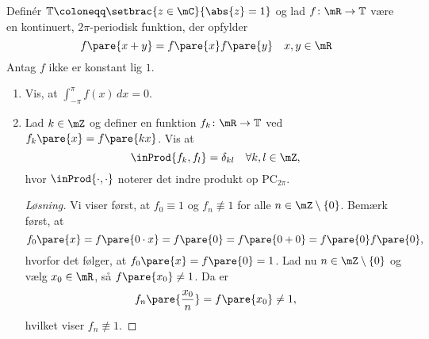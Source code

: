 \begin{opg}
Definér $\mathbb{T}\coloneqq\setbrac{z\in\mC}{\abs{z} = 1}$ og lad $f\colon\mR\to\mathbb{T}$ være en kontinuert, $2\pi$-periodisk funktion, der opfylder
$$ f\pare{x+y} = f\pare{x}f\pare{y} \quad x,y\in\mR$$
Antag $f$ ikke er konstant lig $1$. 
\begin{enumerate}
    \item Vis, at $\int_{-\pi}^{\pi} f(x)\,dx = 0$.
    
    \iffalse\begin{proof}[Løsning]
    Lad $x_0\in\mR$ og antag $f\pare{x_0}\neq 1$. Da $f$ er $2\pi$-periodisk kan vi antage $x_0\in[0,2\pi)$. Vi får ved integration ved substitution, at
    $$ \int_{-\pi}^\pi f\pare{x} \, dx
        = \int_{-\pi-x_0}^{\pi-x_0} f\pare{x+x_0} \, dx
        = f\pare{x_0}\int_{-\pi-x_0}^{\pi-x_0} f\pare{x} \, dx $$
    Ved at udnytte $2\pi$-periodiciteten af $f$, får vi
    \begin{align*}
        \int_{-\pi-x_0}^{\pi-x_0} f\pare{x} \, dx  
            = \int_{-\pi-x_0}^{-\pi} f\pare{x} \, dx
                + \int_{-\pi}^{\pi-x_0} f\pare{x} \, dx 
            &= \int_{-\pi-x_0}^{-\pi} f\pare{x+2\pi} \, dx
                + \int_{-\pi}^{\pi-x_0} f\pare{x} \, dx \\
            &\overset{\pare{\dagger}}{=} \int_{\pi-x_0}^{\pi} f\pare{x} \, dx
                + \int_{-\pi}^{\pi-x_0} f\pare{x} \, dx \\
            &= \int_{-\pi}^{\pi} f\pare{x} \, dx
    \end{align*}
    hvor $\pare{\dagger}$ følger ved integration ved substitution med $y = x+2\pi$. 
    
    Ved indsættelse i den oprindelige ligning fås nu
    $$ \pare{1-f\pare{x_0}}\int_{-\pi}^\pi f\pare{x} \, dx
        = 0, $$
    hvorfor vi konkluderer $\int_{-\pi}^\pi f\pare{x} \, dx = 0$.
    \end{proof}\fi
    
    \item Lad $k\in\mZ$ og definer en funktion $f_k\colon\mR\to\mathbb{T}$ ved $f_k\pare{x} = f\pare{kx}$. Vis at
    $$ \inProd{f_k, f_l} = \delta_{kl}\quad \forall k,l \in \mZ, $$
    hvor $\inProd{\cdot,\cdot}$ noterer det indre produkt op $\text{PC}_{2\pi}$.
    
    \iffalse\begin{proof}[Løsning]
    Vi viser først, at $f_0\equiv 1$ og $f_n \not\equiv 1$ for alle $n\in\mZ\setminus\{0\}$. Bemærk først, at
    $$ f_0\pare{x} = f\pare{0\cdot x} = f\pare{0} = f\pare{0+0} = f\pare{0}f\pare{0}, $$
    hvorfor det følger, at $f_0\pare{x} = f\pare{0} = 1$. Lad nu $n\in\mZ\setminus\{0\}$ og vælg $x_0\in\mR$, så $f\pare{x_0}\neq 1$. Da er
    $$ f_n\pare{\frac{x_0}{n}} = f\pare{x_0} \neq 1, $$
    hvilket viser $f_n\not\equiv 1$.
    

\end{proof}
\end{enumerate}
\end{opg}
